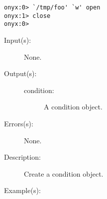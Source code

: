 \begin{description}
\begin{description}
\begin{verbatim}
onyx:0> `/tmp/foo' `w' open
onyx:1> close
onyx:0>
		\end{verbatim}
	\end{description}
\label{systemdict:condition}
\item[{\onyxop{--}{condition}{condition}}: ]
	\begin{description}\item[]
	\item[Input(s): ] None.
	\item[Output(s): ]
		\begin{description}\item[]
		\item[condition: ]
			A condition object.
		\end{description}
	\item[Errors(s): ] None.
	\item[Description: ]
		Create a condition object.
	\item[Example(s): ]\begin{verbatim}


\end{verbatim}
\end{description}
\end{description}
